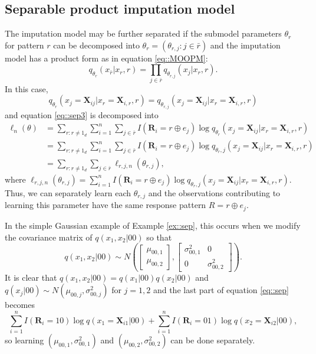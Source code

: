 \documentclass[aos, preprint]{imsart}
\theoremstyle{plain}
\theoremstyle{definition}
\newcommand{\bX}{\mathbf{X}}
\newcommand{\bR}{\mathbf{R}}
\begin{document}
\begin{appendix}
\subsection{Separable product imputation model}	\label{sec::sepprod}
The imputation model may be further separated if the submodel parameters $\theta_r$ for pattern $r$
can be  decomposed into $\theta_r = (\theta_{r,j}: j \in \bar r)$
and the imputation model has a product form as in equation \eqref{eq::MOOPM}:
$$
q_{\theta_r}(x_{\bar r} |x_r, r) = \prod_{j \in \bar r}q_{\theta_{r,j}}(x_j |x_r, r).
$$
In this case, 
$$
q_{\theta_r}(x_j = \bX_{ij}|x_{r} = \bX_{i,r}, r) = q_{\theta_{r,j}}(x_j = \bX_{ij}|x_{r} = \bX_{i,r}, r)
$$
and
equation \eqref{eq::sep3} is  decomposed into
\begin{align*}
\ell_n(\theta) &=\sum_{r:r\neq 1_d} \sum_{i=1}^n   \sum_{j \in \bar r} I(\bR_i = r\oplus e_j)\log q_{\theta_r}(x_j = \bX_{ij}|x_{r} = \bX_{i,r}, r)\\
&=\sum_{r:r\neq 1_d} \sum_{i=1}^n   \sum_{j \in \bar r} I(\bR_i = r\oplus e_j)\log q_{\theta_r,j}(x_j = \bX_{ij}|x_{r} = \bX_{i,r}, r)\\
& =  \sum_{r:r\neq 1_d} \sum_{j \in \bar r} \ell_{r,j, n}(\theta_{r,j}),
\end{align*}
where $\ell_{r,j, n}(\theta_{r,j}) = \sum_{i=1}^n I(\bR_i = r\oplus e_j)\log q_{\theta_r,j}(x_j = \bX_{ij}|x_{r} = \bX_{i,r}, r)$.
Thus, we can separately learn each $\theta_{r,j}$
and the observations contributing to learning this parameter have the same response pattern $R = r\oplus e_j$.


In the  simple Gaussian example of Example \ref{ex::sep}, this occurs when we modify the covariance matrix of $q(x_1,x_2|00)$ 
so that
$$
q(x_1,x_2| 00) \sim N\left(\begin{bmatrix}\mu_{00,1}\\
\mu_{00,2}
\end{bmatrix},
\begin{bmatrix}
\sigma_{00,1}^2 & 0\\
0 &\sigma_{00,2}^2
\end{bmatrix}\right).
$$
It is clear that $q(x_1,x_2| 00) = q(x_1| 00)q(x_2| 00)$
and 
$q(x_j| 00)\sim N(\mu_{00,j}, \sigma_{00,j}^2)$ for $j=1,2$
and the last part of equation \eqref{eq::sep}
becomes
$$
\sum_{i=1}^n I(\bR_i = 10) \log q(x_1 = \bX_{i1}| 00) +\sum_{i=1}^n I(\bR_i = 01) \log q(x_2 = \bX_{i2}| 00),
$$
so learning $(\mu_{00,1},\sigma_{00,1}^2)$ and $(\mu_{00,2}, \sigma_{00,2}^2)$
can be done separately.





\end{appendix}
\end{document}
